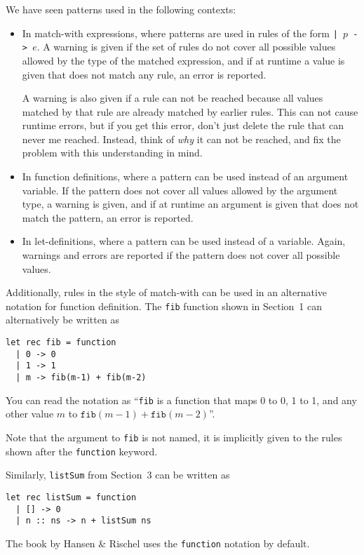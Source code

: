 \documentclass[a4paper]{article}
\begin{document}
\noindent
We have seen patterns used in the following contexts:

\begin{itemize}
\item In match-with expressions, where patterns are used in rules of
  the form \texttt{| $p$ -> $e$}.  A warning is given if the set of
  rules do not cover all possible values allowed by the type of the
  matched expression, and if at runtime a value is given that does not
  match any rule, an error is reported.

  A warning is also given if a rule can not be reached because all
  values matched by that rule are already matched by earlier rules.
  This can not cause runtime errors, but if you get this error, don't
  just delete the rule that can never me reached.  Instead, think of
  \emph{why} it can not be reached, and fix the problem with this
  understanding in mind.
\item In function definitions, where a pattern can be used instead of
  an argument variable. If the pattern does not cover all values
  allowed by the argument type, a warning is given, and if at runtime
  an argument is given that does not match the pattern, an error is
  reported.
\item In let-definitions, where a pattern can be used instead of a
  variable.  Again, warnings and errors are reported if the pattern
  does not cover all possible values.
\end{itemize}

\noindent
Additionally, rules in the style of match-with can be used in an
alternative notation for function definition.  The \texttt{fib}
function shown in Section~1 can alternatively be written as

\begin{verbatim}
let rec fib = function
  | 0 -> 0
  | 1 -> 1
  | m -> fib(m-1) + fib(m-2)
\end{verbatim}

\noindent
You can read the notation as ``\texttt{fib} is a function that maps 0
to 0, 1 to 1, and any other value $m$ to
$\texttt{fib}(m-1)+\texttt{fib}(m-2)$''.

Note that the argument to \texttt{fib} is not named, it is implicitly
given to the rules shown after the \texttt{function} keyword.

Similarly, \texttt{listSum} from Section~3 can be written as


\begin{verbatim}
let rec listSum = function
  | [] -> 0
  | n :: ns -> n + listSum ns
\end{verbatim}

\noindent
The book by Hansen \& Rischel uses the \texttt{function} notation by default.
\end{document}
